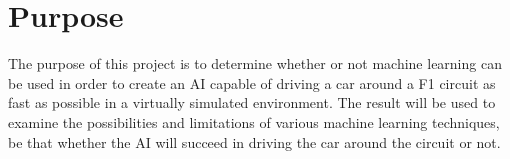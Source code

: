 

\chapter{Purpose}
The purpose of this project is to determine whether or not machine learning can be used in order to create an AI capable of driving a car around a F1 circuit as fast as possible in a virtually simulated environment. The result will be used to examine the possibilities and limitations of various machine learning techniques, be that whether the AI will succeed in driving the car around the circuit or not. 





